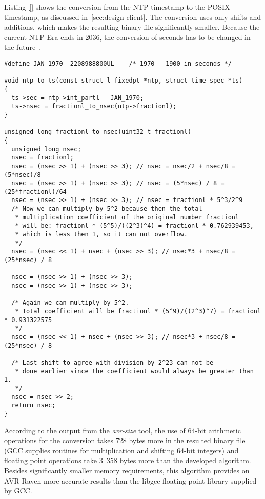 Listing~\ref{} shows the conversion from the NTP timestamp to the POSIX timestamp,
as discussed in~\ref{sec:design-client}.
The conversion uses only shifts and additions, which makes the resulting binary file
significantly smaller.
Because the current NTP Era ends in 2036,
the conversion of seconds has to be changed in the future~\cite{ntp-y2k}.
\begin{lstlisting}[caption={Conversion from NTP timestamp to POSIX timestamp},label={lst:implementation-conversion}]
#define	JAN_1970  2208988800UL    /* 1970 - 1900 in seconds */

void ntp_to_ts(const struct l_fixedpt *ntp, struct time_spec *ts)
{
  ts->sec = ntp->int_partl - JAN_1970;
  ts->nsec = fractionl_to_nsec(ntp->fractionl);
}

unsigned long fractionl_to_nsec(uint32_t fractionl)
{
  unsigned long nsec;
  nsec = fractionl;
  nsec = (nsec >> 1) + (nsec >> 3); // nsec = nsec/2 + nsec/8 = (5*nsec)/8
  nsec = (nsec >> 1) + (nsec >> 3); // nsec = (5*nsec) / 8 = (25*fractionl)/64
  nsec = (nsec >> 1) + (nsec >> 3); // nsec = fractionl * 5^3/2^9
  /* Now we can multiply by 5^2 because then the total
   * multiplication coefficient of the original number fractionl
   * will be: fractionl * (5^5)/((2^3)^4) = fractionl * 0.762939453,
   * which is less then 1, so it can not overflow.
   */
  nsec = (nsec << 1) + nsec + (nsec >> 3); // nsec*3 + nsec/8 = (25*nsec) / 8

  nsec = (nsec >> 1) + (nsec >> 3);
  nsec = (nsec >> 1) + (nsec >> 3);

  /* Again we can multiply by 5^2.
   * Total coefficient will be fractionl * (5^9)/((2^3)^7) = fractionl * 0.931322575
   */
  nsec = (nsec << 1) + nsec + (nsec >> 3); // nsec*3 + nsec/8 = (25*nsec) / 8

  /* Last shift to agree with division by 2^23 can not be
   * done earlier since the coefficient would always be greater than 1.
   */
  nsec = nsec >> 2;
  return nsec;
}
\end{lstlisting}
According to the output from the {\it{avr-size}} tool,
the use of 64-bit arithmetic operations for the conversion
takes 728 bytes more in the
resulted binary file (GCC supplies routines for multiplication and shifting 64-bit integers)
and floating point operations take 3~358 bytes more
than the developed algorithm.
Besides significantly smaller memory requirements,
this algorithm provides on AVR Raven more accurate results than the libgcc
floating point library supplied by GCC.
